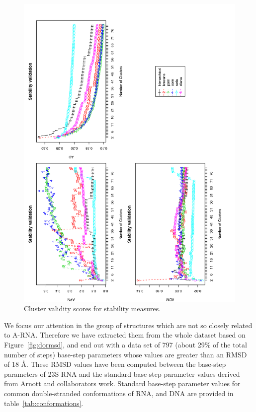 \begin{figure}
 \centering
\includegraphics[angle=0, scale=0.38]{Chapter2/STval_sta.png}
\caption{Cluster validity scores for stability measures.}
 \label{fig:stability}
\end{figure}

We focus  our attention in  the group of  structures which are  not so
closely related  to A-RNA. Therefore  we have extracted them  from the
whole  dataset based on  Figure~\ref{fig:dormsd}, and  end out  with a
data set  of 797 (about 29\%  of the total number  of steps) base-step
parameters whose  values are  greater than an  RMSD of 18  \AA.  These
RMSD values have been computed between the base-step parameters of 23S
RNA and  the standard base-step  parameter values derived  from Arnott
and   collaborators   \cite{arnott1973}   work.   Standard   base-step
parameter values for common  double-stranded conformations of RNA, and
DNA are provided in table~\ref{tab:conformations}.

